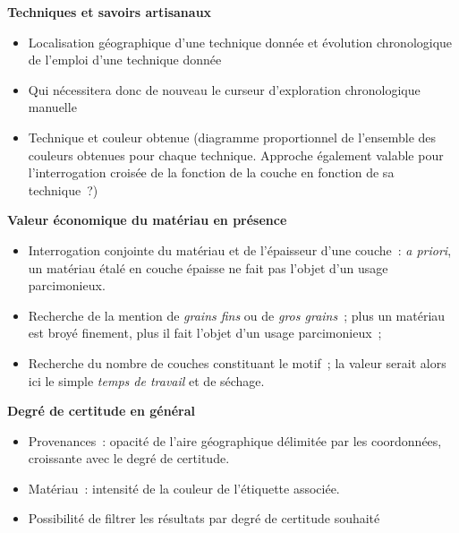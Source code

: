 \documentclass[a4paper,12pt, twoside]{book}
\begin{document}
\large \textbf{\textcolor{teal2}{Techniques et savoirs artisanaux}}\\

\normalsize
\begin{itemize}
    \item Localisation géographique d’une technique donnée et évolution chronologique de l’emploi d’une technique donnée\\

    \item Qui nécessitera donc de nouveau le curseur d’exploration chronologique manuelle\\

    \item Technique et couleur obtenue (diagramme proportionnel de l’ensemble des couleurs obtenues pour chaque technique. Approche également valable pour l’interrogation croisée de la fonction de la couche en fonction de sa technique~?)
\end{itemize}   

\large \textbf{\textcolor{teal2}{Valeur économique du matériau en présence}}\\

\normalsize
\begin{itemize}
    \item Interrogation conjointe du matériau et de l’épaisseur d’une couche~: \textit{a priori}, un matériau étalé en couche épaisse ne fait pas l’objet d’un usage parcimonieux.\\

    \item Recherche de la mention de \textit{grains fins} ou de \textit{gros grains}~; plus un matériau est broyé finement, plus il fait l’objet d’un usage parcimonieux~;\\

    \item Recherche du nombre de couches constituant le motif~; la valeur serait alors ici le simple \textit{temps de travail} et de séchage.
\end{itemize}    

\large \textbf{\textcolor{teal2}{Degré de certitude en général}}\\

\normalsize
\begin{itemize}
    \item Provenances~: opacité de l’aire géographique délimitée par les coordonnées, croissante avec le degré de certitude.\\

    \item Matériau~: intensité de la couleur de l’étiquette associée.\\

    \item Possibilité de filtrer les résultats par degré de certitude souhaité
\end{itemize}  
\end{document}
